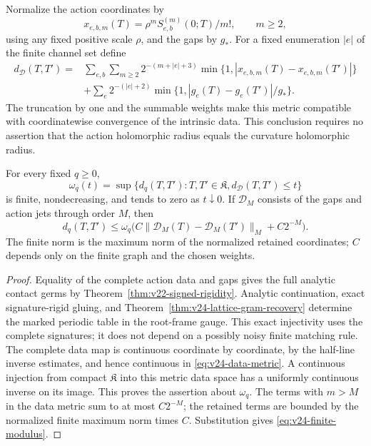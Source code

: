 Normalize the action coordinates by
\[
 x_{e,b,m}(T)=\rho^mS_{e,b}^{(m)}(0;T)/m!,\qquad m\ge2,
\]
using any fixed positive scale \(\rho\), and the gaps by \(g_*\).
For a fixed enumeration \(|e|\) of the finite channel set define
\begin{equation}\label{eq:v24-data-metric}
 \begin{split}
 d_{\mathcal D}(T,T')={}&\sum_{e,b}\sum_{m\ge2}2^{-(m+|e|+3)}
          \min\{1,|x_{e,b,m}(T)-x_{e,b,m}(T')|\}\\
 &+\sum_e2^{-(|e|+2)}\min\{1,|g_e(T)-g_e(T')|/g_*\}.
 \end{split}
\end{equation}
The truncation by one and the summable weights make this metric compatible
with coordinatewise convergence of the intrinsic data.  This conclusion
requires no assertion that the action holomorphic radius equals the
curvature holomorphic radius.

\begin{theorem}
\label{thm:v24-global-modulus}
For every fixed \(q\ge0\),
\begin{equation}\label{eq:v24-global-modulus-def}
 \omega_q(t)=\sup\{d_q(T,T'):T,T'\in\mathfrak K,
                                   d_{\mathcal D}(T,T')\le t\}
\end{equation}
is finite, nondecreasing, and tends to zero as \(t\downarrow0\).
If \(\mathcal D_M\) consists of the gaps and action jets through order
\(M\), then
\begin{equation}\label{eq:v24-finite-modulus}
 d_q(T,T')\le\omega_q\bigl(C\|\mathcal D_M(T)-\mathcal D_M(T')\|_M
                                             +C2^{-M}\bigr).
\end{equation}
The finite norm is the maximum norm of the normalized retained coordinates;
\(C\) depends only on the finite graph and the chosen weights.
\end{theorem}

\begin{proof}
Equality of the complete action data and gaps gives the full analytic
contact germs by Theorem~\ref{thm:v22-signed-rigidity}.  Analytic continuation,
exact signature-rigid gluing, and
Theorem~\ref{thm:v24-lattice-gram-recovery} determine the marked periodic
table in the root-frame gauge.  This exact injectivity uses the complete
signatures; it does not depend on a possibly noisy finite matching rule.
The complete data map is continuous coordinate by coordinate, by the
half-line inverse estimates, and hence continuous in
\eqref{eq:v24-data-metric}.  A continuous injection from compact
\(\mathfrak K\) into this metric data space has a uniformly continuous
inverse on its image.  This proves the assertion about \(\omega_q\).
The terms with \(m>M\) in the data metric sum to at most \(C2^{-M}\);
the retained terms are bounded by the normalized finite maximum norm times
\(C\).  Substitution gives \eqref{eq:v24-finite-modulus}.
\end{proof}

